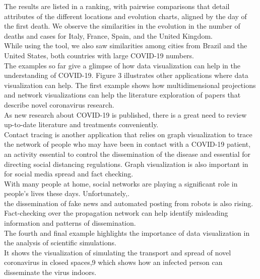 The results are listed in a ranking, with pairwise comparisons that detail attributes of the different locations and evolution charts, aligned by the day of the first death. We observe the similarities in the evolution in the number of deaths and cases for Italy, France, Spain, and the United Kingdom.\\

While using the tool, we also saw similarities among cities from Brazil and the United States, both countries with large COVID-19 numbers.\\

The examples so far give a glimpse of how data visualization can help in the understanding of COVID-19. Figure 3 illustrates other applications where data visualization can help. The first example shows how multidimensional projections and network visualizations can help the literature exploration of papers that describe novel coronavirus research.\\

As new research about COVID-19 is published, there is a great need to review up-to-date literature and treatments conveniently.\\

Contact tracing is another application that relies on graph visualization to trace the network of people who may have been in contact with a COVID-19 patient, an activity essential to control the dissemination of the disease and essential for directing social distancing regulations. Graph visualization is also important in for social media spread and fact checking. \\

With many people at home, social networks are playing a significant role in people’s lives these days. Unfortunately,.\\

the dissemination of fake news and automated posting from robots is also rising. Fact-checking over the propagation network can help identify misleading information and patterns of dissemination.\\

The fourth and final example highlights the importance of data visualization in the analysis of scientific simulations.\\

It shows the visualization of simulating the transport and spread of novel coronavirus in closed spaces,9 which shows how an infected person can disseminate the virus indoors.\\

